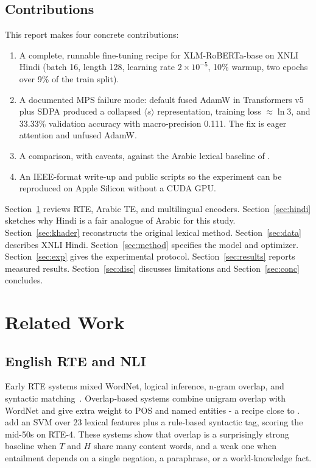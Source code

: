 \documentclass[conference]{IEEEtran}
\begin{document}
\subsection{Contributions}
This report makes four concrete contributions:
\begin{enumerate}
  \item A complete, runnable fine-tuning recipe for XLM-RoBERTa-base on XNLI Hindi (batch 16, length 128, learning rate $2\times 10^{-5}$, 10\% warmup, two epochs over 9\% of the train split).
  \item A documented MPS failure mode: default fused AdamW in Transformers v5 plus SDPA produced a collapsed $\langle s\rangle$ representation, training loss $\approx \ln 3$, and 33.33\% validation accuracy with macro-precision 0.111. The fix is eager attention and unfused AdamW.
  \item A comparison, with caveats, against the Arabic lexical baseline of \citet{khader2016textual}.
  \item An IEEE-format write-up and public scripts so the experiment can be reproduced on Apple Silicon without a CUDA GPU.
\end{enumerate}

Section~\ref{sec:related} reviews RTE, Arabic TE, and multilingual encoders. Section~\ref{sec:hindi} sketches why Hindi is a fair analogue of Arabic for this study. Section~\ref{sec:khader} reconstructs the original lexical method. Section~\ref{sec:data} describes XNLI Hindi. Section~\ref{sec:method} specifies the model and optimizer. Section~\ref{sec:exp} gives the experimental protocol. Section~\ref{sec:results} reports measured results. Section~\ref{sec:disc} discusses limitations and Section~\ref{sec:conc} concludes.

\section{Related Work}
\label{sec:related}

\subsection{English RTE and NLI}
Early RTE systems mixed WordNet, logical inference, n-gram overlap, and syntactic matching~\citep{barhaim2006rte}. Overlap-based systems combine unigram overlap with WordNet and give extra weight to POS and named entities - a recipe close to \citet{khader2016textual}. \citet{pakray2011textual} add an SVM over 23 lexical features plus a rule-based syntactic tag, scoring the mid-50s on RTE-4. These systems show that overlap is a surprisingly strong baseline when $T$ and $H$ share many content words, and a weak one when entailment depends on a single negation, a paraphrase, or a world-knowledge fact.
\end{document}
